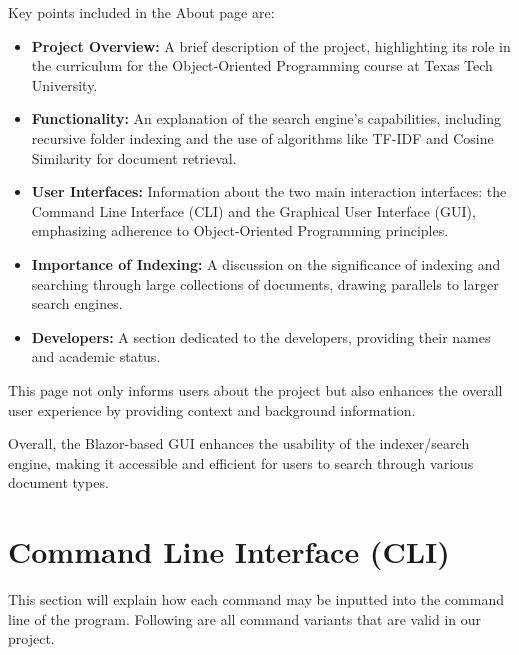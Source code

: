 \documentclass{article}
\begin{document}
Key points included in the About page are:
\begin{itemize}
    \item \textbf{Project Overview:} A brief description of the project, highlighting its role in the curriculum for the Object-Oriented Programming course at Texas Tech University.
    \item \textbf{Functionality:} An explanation of the search engine's capabilities, including recursive folder indexing and the use of algorithms like TF-IDF and Cosine Similarity for document retrieval.
    \item \textbf{User Interfaces:} Information about the two main interaction interfaces: the Command Line Interface (CLI) and the Graphical User Interface (GUI), emphasizing adherence to Object-Oriented Programming principles.
    \item \textbf{Importance of Indexing:} A discussion on the significance of indexing and searching through large collections of documents, drawing parallels to larger search engines.
    \item \textbf{Developers:} A section dedicated to the developers, providing their names and academic status.
\end{itemize}

This page not only informs users about the project but also enhances the overall user experience by providing context and background information.

Overall, the Blazor-based GUI enhances the usability of the indexer/search engine, making it accessible and efficient for users to search through various document types.

\section{Command Line Interface (CLI)}
This section will explain how each command may be inputted into the command line of the program. Following are all command variants that are valid in our project.
\end{document}
